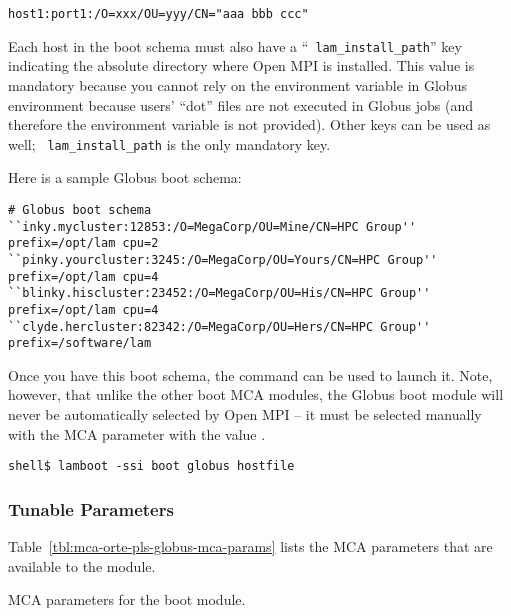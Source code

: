 \centerline{\tt host1:port1:/O=xxx/OU=yyy/CN="aaa bbb ccc"}
  
Each host in the boot schema must also have a ``{\tt
  lam\_\-install\_\-path}'' key indicating the absolute directory
where Open MPI is installed.  This value is mandatory because you
cannot rely on the  environment variable in Globus
environment because users' ``dot'' files are not executed in Globus
jobs (and therefore the  environment variable is not
provided).  Other keys can be used as well; {\tt
  lam\_\-install\_\-path} is the only mandatory key.

Here is a sample Globus boot schema:

\lstset{style=lam-shell}
\begin{lstlisting}
# Globus boot schema
``inky.mycluster:12853:/O=MegaCorp/OU=Mine/CN=HPC Group'' prefix=/opt/lam cpu=2
``pinky.yourcluster:3245:/O=MegaCorp/OU=Yours/CN=HPC Group'' prefix=/opt/lam cpu=4
``blinky.hiscluster:23452:/O=MegaCorp/OU=His/CN=HPC Group'' prefix=/opt/lam cpu=4
``clyde.hercluster:82342:/O=MegaCorp/OU=Hers/CN=HPC Group'' prefix=/software/lam
\end{lstlisting}

Once you have this boot schema, the  command can be used
to launch it.  Note, however, that unlike the other boot MCA modules,
the Globus boot module will never be automatically selected by Open MPI --
it must be selected manually with the  MCA parameter
with the value .

\lstset{style=lam-cmdline}
\begin{lstlisting}
shell$ lamboot -ssi boot globus hostfile
\end{lstlisting}


\subsubsection{Tunable Parameters}

Table~\ref{tbl:mca-orte-pls-globus-mca-params} lists the MCA
parameters that are available to the  module.

\begin{table}[htbp]
  \begin{ssiparamtb}
%
  \end{ssiparamtb}
  \caption{MCA parameters for the  boot module.}
  \label{tbl:mca-orte-pls-globus-mca-params}
\end{table}


